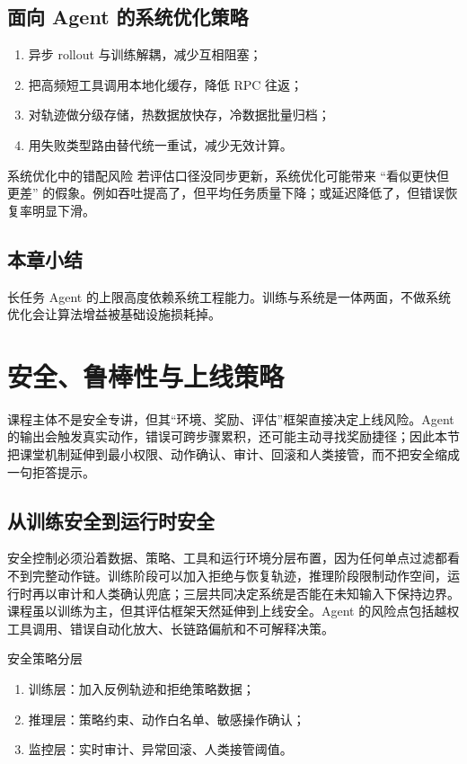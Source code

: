 \documentclass[a4paper]{article}
\begin{document}
\subsection{面向 Agent 的系统优化策略}
\begin{enumerate}
    \item 异步 rollout 与训练解耦，减少互相阻塞；
    \item 把高频短工具调用本地化缓存，降低 RPC 往返；
    \item 对轨迹做分级存储，热数据放快存，冷数据批量归档；
    \item 用失败类型路由替代统一重试，减少无效计算。
\end{enumerate}

\begin{warningbox}{系统优化中的错配风险}
若评估口径没同步更新，系统优化可能带来 ``看似更快但更差'' 的假象。例如吞吐提高了，但平均任务质量下降；或延迟降低了，但错误恢复率明显下滑。
\end{warningbox}

\subsection{本章小结}
长任务 Agent 的上限高度依赖系统工程能力。训练与系统是一体两面，不做系统优化会让算法增益被基础设施损耗掉。


\section{安全、鲁棒性与上线策略}

课程主体不是安全专讲，但其“环境、奖励、评估”框架直接决定上线风险。Agent 的输出会触发真实动作，错误可跨步骤累积，还可能主动寻找奖励捷径；因此本节把课堂机制延伸到最小权限、动作确认、审计、回滚和人类接管，而不把安全缩成一句拒答提示。

\subsection{从训练安全到运行时安全}
安全控制必须沿着数据、策略、工具和运行环境分层布置，因为任何单点过滤都看不到完整动作链。训练阶段可以加入拒绝与恢复轨迹，推理阶段限制动作空间，运行时再以审计和人类确认兜底；三层共同决定系统是否能在未知输入下保持边界。
课程虽以训练为主，但其评估框架天然延伸到上线安全。Agent 的风险点包括越权工具调用、错误自动化放大、长链路偏航和不可解释决策。

\begin{importantbox}{安全策略分层}
\begin{enumerate}
    \item 训练层：加入反例轨迹和拒绝策略数据；
    \item 推理层：策略约束、动作白名单、敏感操作确认；
    \item 监控层：实时审计、异常回滚、人类接管阈值。
\end{enumerate}
\end{importantbox}
\end{document}
